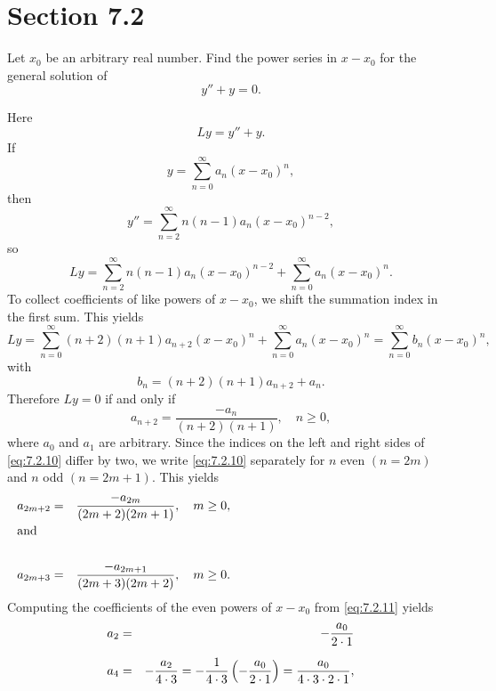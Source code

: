 \section*{Section 7.2}
\setcounter{chapter}{7}
\setcounter{section}{2}

\setcounter{example}{0}
\setcounter{equation}{8}
\begin{example}
  \label{example:7.2.1}\rm Let $x_{0}$ be an arbitrary real number. Find the power series in
  $x-x_{0}$ for the general solution of
  \begin{equation}
    \label{eq:7.2.9}y''+y=0.
  \end{equation}
\end{example}
\setcounter{equation}{9}
\begin{examplesolution}
\solution Here
\[
  Ly=y''+y.
\]
If
\[
  y=\sum_{n=0}^{\infty}a_{n}(x-x_{0})^{n},
\]
then
\[
  y''=\sum_{n=2}^{\infty}n(n-1)a_{n}(x-x_{0})^{n-2},
\]
so
\[
  Ly=\sum_{n=2}^{\infty}n(n-1)a_{n}(x-x_{0})^{n-2}+\sum_{n=0}^{\infty}a_{n}(x-x_{0})^{n}.
\]
To collect coefficients of like powers of $x-x_{0}$, we shift the summation index in the first sum.
This yields
\[
  Ly=\sum^{\infty}_{n=0}(n+2)(n+1)a_{n+2}(x-x_{0})^{n}+ \sum^{\infty}_{n=0}a_{n}(x-x_{0})^{n}=\sum^{\infty}_{n=0}b_{n}(x-x_{0})^{n},
\]
with
\[
  b_{n}=(n+2)(n+1)a_{n+2}+a_{n}.
\]
Therefore $Ly=0$ if and only if
\begin{equation}
  \label{eq:7.2.10}a_{n+2}=\frac{-a_{n}}{(n+2)(n+1)},\quad n\ge0,
\end{equation}
where $a_{0}$ and $a_{1}$ are arbitrary. Since the indices on the left and right sides of
\eqref{eq:7.2.10} differ by two, we write \eqref{eq:7.2.10} separately for $n$ even $(n=2m)$ and $n$
odd $(n=2m+1)$. This yields
\begin{eqnarray}
  a_{2m+2}&=&\frac{-a_{2m}}{(2m+2)(2m+1)},\quad m\ge0, \label{eq:7.2.11} \\%
  \noalign{\hspace*{-15pt}\mbox{and}}\nonumber\\ a_{2m+3}&=&\frac{-a_{2m+1}}{(2m+3)(2m+2)},\quad m\ge0. \label{eq:7.2.12}
\end{eqnarray}
Computing the coefficients of the even powers of $x-x_{0}$ from \eqref{eq:7.2.11} yields
\begin{eqnarray*}
  a_{2} & = & -\frac{a_{0}}{2\cdot1}                                                                                          \\[2\jot]
  a_{4} & = & -\frac{a_{2}}{4\cdot3}=-\frac{1}{4\cdot3}\left(-\frac{a_{0}}{2\cdot1}\right)=\frac{a_{0}}{4\cdot3\cdot2\cdot1}, \\

\end{eqnarray*}
\end{examplesolution}
